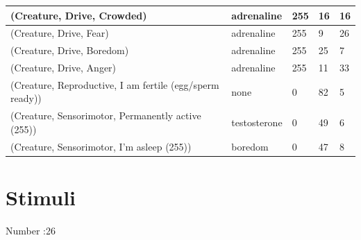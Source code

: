 \documentclass{article}
\begin{document}
\begin{longtable}{|p{7cm}|p{3cm}|p{2cm}|p{2cm}|p{2cm}|}
(Creature, Drive, Crowded) & adrenaline & 255 & 16 & 16 \\ \hline
(Creature, Drive, Fear) & adrenaline & 255 & 9 & 26 \\ \hline
(Creature, Drive, Boredom) & adrenaline & 255 & 25 & 7 \\ \hline
(Creature, Drive, Anger) & adrenaline & 255 & 11 & 33 \\ \hline
(Creature, Reproductive, I am fertile (egg/sperm ready)) & none & 0 & 82 & 5 \\ \hline
(Creature, Sensorimotor, Permanently active (255)) & testosterone & 0 & 49 & 6 \\ \hline
(Creature, Sensorimotor, I'm asleep (255)) & boredom & 0 & 47 & 8 \\ \hline
\end{longtable}

\newpage

\section*{Stimuli}

Number :26
\end{document}
